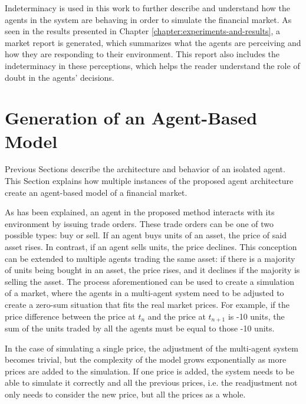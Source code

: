 Indeterminacy is used in this work to further describe and understand how the
agents in the system are behaving in order to simulate the financial market. As
seen in the results presented in Chapter \ref{chapter:experiments-and-results}, a market
report is generated, which summarizes what the agents are perceiving and how
they are responding to their environment. This report also includes the
indeterminacy in these perceptions, which helps the reader understand the role
of doubt in the agents' decisions.

\section{Generation of an Agent-Based Model}
\label{section:generation-of-an-agent-based-model}

Previous Sections describe the architecture and behavior of an isolated
agent. This Section explains how multiple instances of the proposed agent
architecture create an agent-based model of a financial market.

As has been explained, an agent in the proposed method interacts with its
environment by issuing trade orders. These trade orders can be one of two
possible types: buy or sell. If an agent buys units of an asset, the price of
said asset rises. In contrast, if an agent sells units, the price declines. This
conception can be extended to multiple agents trading the same asset: if there
is a majority of units being bought in an asset, the price rises, and it
declines if the majority is selling the asset. The process aforementioned can be
used to create a simulation of a market, where the agents in a multi-agent
system need to be adjusted to create a zero-sum situation that fits the real
market prices. For example, if the price difference between the price at $t_n$
and the price at $t_{n+1}$ is -10 units, the sum of the units traded by all the
agents must be equal to those -10 units.

In the case of simulating a single price, the adjustment of the multi-agent
system becomes trivial, but the complexity of the model grows exponentially as
more prices are added to the simulation. If one price is added, the system needs
to be able to simulate it correctly and all the previous prices, i.e. the
readjustment not only needs to consider the new price, but all the prices as a
whole.

